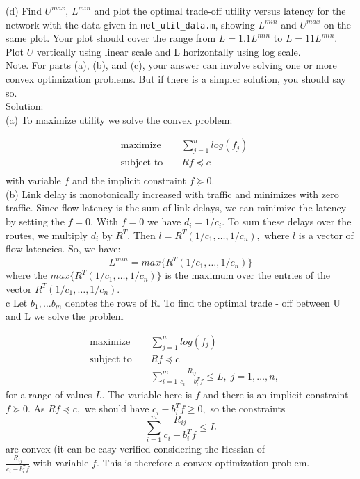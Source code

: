 \documentclass{article}
\begin{document}
(d) Find $U^{max}$, $L^{min}$ and plot the optimal trade-off utility versus latency 
for the network with the data given in  \verb!net_util_data.m!, showing $L^{min}$ 
and $U^{max}$ on the same plot. Your plot should cover the range from 
$L = 1.1 L^{min}$ to $L = 11 L^{min}.$ Plot $U$ vertically using linear scale and 
L horizontally using log scale. \\ 

Note. For parts (a), (b), and (c), your answer can involve solving one or more convex optimization problems. But if there is a simpler solution, you should say so.
\\

Solution: \\

(a) To maximize utility we solve the convex problem:

\begin{align*}
	&\text{maximize } &&  \sum_{j = 1}^{n} log(f_j) \\
	&\text{subject to } && Rf \preceq c\\
\end{align*} 
with variable $f$ and the implicit constraint $f \succeq 0.$ \\

(b) Link delay is monotonically increased with traffic and minimizes with zero traffic. Since flow latency is the sum of link delays, we can minimize the latency by setting the $f = 0.$ With $f = 0$ we have $d_i = 1 / c_i.$ To sum these delays over the routes, we multiply $d_i$ by $R^T.$ Then $l = R^T (1/c_1, \dots, 1/c_n),$
where $l$ is a vector of flow latencies. So, we have:
$$
L^{min} = max\{R^T (1/c_1, \dots, 1/c_n)\}
$$
where the $ max\{R^T (1/c_1, \dots, 1/c_n)\}$ is the maximum over the entries of the vector $R^T (1/c_1, \dots, 1/c_n).$\\


{c} Let $b_1, \dots b_m$ denotes the rows of R. To find the optimal trade - off between U and L we solve the problem 

\begin{align*}
	&\text{maximize } &&  \sum_{j = 1}^{n} log(f_j) \\
	&\text{subject to } && Rf \preceq c\\
	& && \sum_{i = 1}^m \frac{R_{ij}}{c_i - b_i^T f} \leq L, \; j = 1,\dots, n,
\end{align*} 
for a range of values $L.$ The variable here is $f$ and there is an implicit constraint $f \succeq 0.$ As $Rf \preceq c,$ we should have 
$c_i - b_i^T f \geq 0,$
so the constraints 
$$\sum_{i = 1}^m \frac{R_{ij}}{c_i - b_i^T f} \leq L$$
are convex (it can be easy verified considering the Hessian of \\
$\frac{R_{ij}}{c_i - b_i^T f}$ with variable $f.$ This is therefore a convex optimization problem.
\end{document}
